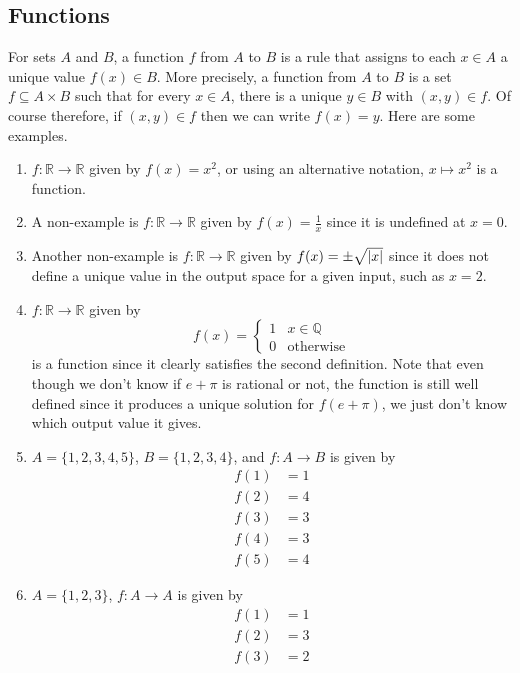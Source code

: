 \documentclass{article}
\begin{document}
\subsection{Functions}
For sets $A$ and $B$, a function $f$ from $A$ to $B$ is a rule that assigns to each $x \in A$ a unique value $f(x) \in B$. More precisely, a function from $A$ to $B$ is a set $f \subseteq A \times B$ such that for every $x \in A$, there is a unique $y \in B$ with $(x, y) \in f$. Of course therefore, if $(x, y) \in f$ then we can write $f(x) = y$. Here are some examples.
\begin{enumerate}
	\item $f\colon \mathbb R \to \mathbb R$ given by $f(x) = x^2$, or using an alternative notation, $x \mapsto x^2$ is a function.
	\item A non-example is $f\colon \mathbb R \to \mathbb R$ given by $f(x) = \frac{1}{x}$ since it is undefined at $x=0$.
	\item Another non-example is $f\colon \mathbb R \to \mathbb R$ given by $f(x) = \pm \sqrt{\abs{x}}$ since it does not define a unique value in the output space for a given input, such as $x=2$.
	\item $f\colon \mathbb R \to \mathbb R$ given by
	      \[ f(x) = \begin{cases}
			      1 & x \in \mathbb Q  \\
			      0 & \text{otherwise}
		      \end{cases} \]
	      is a function since it clearly satisfies the second definition. Note that even though we don't know if $e + \pi$ is rational or not, the function is still well defined since it produces a unique solution for $f(e + \pi)$, we just don't know which output value it gives.
	\item $A = \{ 1, 2, 3, 4, 5 \}$, $B = \{ 1, 2, 3, 4 \}$, and $f\colon A \to B$ is given by
	      \begin{align*}
		      f(1) & = 1 \\
		      f(2) & = 4 \\
		      f(3) & = 3 \\
		      f(4) & = 3 \\
		      f(5) & = 4
	      \end{align*}
	\item $A = \{ 1, 2, 3 \}$, $f\colon A \to A$ is given by
	      \begin{align*}
		      f(1) & = 1 \\
		      f(2) & = 3 \\
		      f(3) & = 2

\end{align*}
\end{enumerate}
\end{document}
